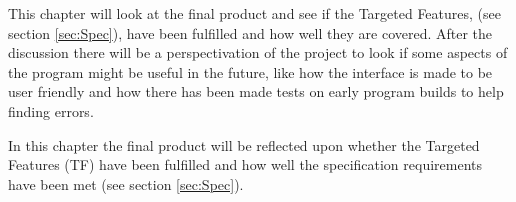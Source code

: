 This chapter will look at the final product and see if the Targeted Features, (see section \ref{sec:Spec}), have been fulfilled and how well they are covered. After the discussion there will be a perspectivation of the project to look if some aspects of the program might be useful in the future, like how the interface is made to be user friendly and how there has been made tests on early program builds to help finding errors.

In this chapter the final product will be reflected upon whether the Targeted Features (TF) have been fulfilled and how well the specification requirements have been met (see section \ref{sec:Spec}).